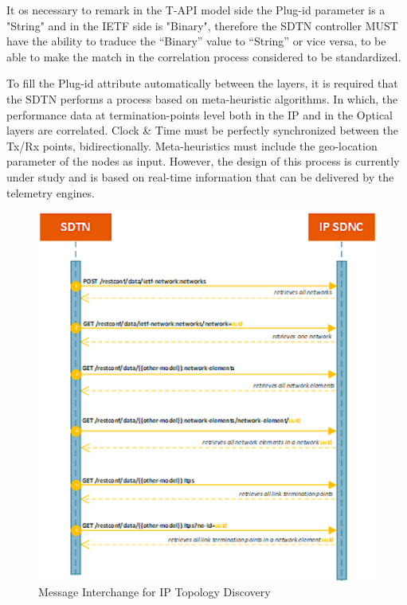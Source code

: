 \documentclass[a4paper,fleqn]{cas-dc}
\begin{document}
It os necessary to remark in the T-API model side the Plug-id parameter is a "String" and in the IETF side is "Binary", therefore the SDTN controller MUST have the ability to traduce the “Binary” value to “String” or vice versa, to be able to make the match in the correlation process considered to be standardized.

To fill the Plug-id attribute automatically between the layers, it is required that the SDTN performs a process based on meta-heuristic algorithms. In which, the performance data at termination-points level both in the IP and in the Optical layers are correlated. Clock \& Time must be perfectly synchronized between the Tx/Rx points, bidirectionally. Meta-heuristics must include the geo-location parameter of the nodes as input. However, the design of this process is currently under study and is based on real-time information that can be delivered by the telemetry engines.

\begin{figure}
	\centering
		\includegraphics[width=\linewidth]{figs/ip_topology_workflow_2.png}
	\caption{Message Interchange for IP Topology Discovery}
	\label{FIG:ip_topology_workflow}
\end{figure}
\end{document}
